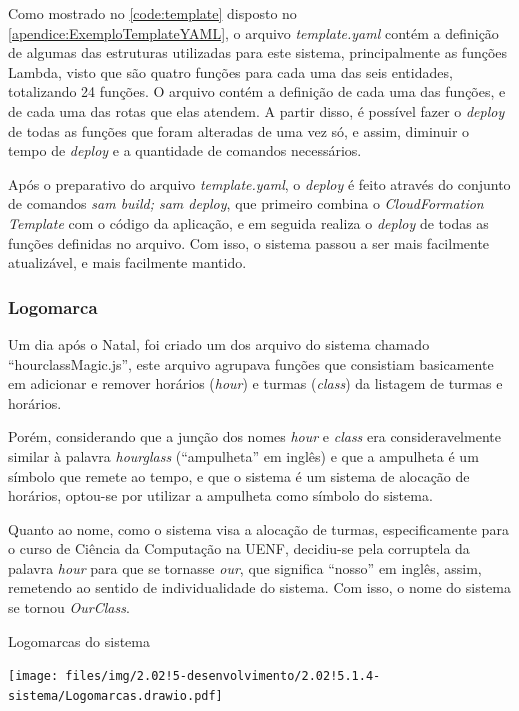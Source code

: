 Como mostrado no \autoref{code:template} disposto no \autoref{apendice:ExemploTemplateYAML}, o arquivo \textit{template.yaml} contém a definição de algumas das estruturas utilizadas para este sistema, principalmente as funções Lambda, visto que são quatro funções para cada uma das seis entidades, totalizando 24 funções. O arquivo contém a definição de cada uma das funções, e de cada uma das rotas que elas atendem. A partir disso, é possível fazer o \textit{deploy} de todas as funções que foram alteradas de uma vez só, e assim, diminuir o tempo de \textit{deploy} e a quantidade de comandos necessários.

Após o preparativo do arquivo \textit{template.yaml}, o \textit{deploy} é feito através do conjunto de comandos \textit{sam build; sam deploy}, que primeiro combina o \textit{CloudFormation Template} com o código da aplicação, e em seguida realiza o \textit{deploy} de todas as funções definidas no arquivo. Com isso, o sistema passou a ser mais facilmente atualizável, e mais facilmente mantido.

\subsubsection{Logomarca} \label{sssec:Logomarca}

Um dia após o Natal, foi criado um dos arquivo do sistema chamado ``hourclassMagic.js'', este arquivo agrupava funções que consistiam basicamente em adicionar e remover horários (\textit{hour}) e turmas (\textit{class}) da listagem de turmas e horários.

Porém, considerando que a junção dos nomes \textit{hour} e \textit{class} era consideravelmente similar à palavra \textit{hourglass} (``ampulheta'' em inglês) e que a ampulheta é um símbolo que remete ao tempo, e que o sistema é um sistema de alocação de horários, optou-se por utilizar a ampulheta como símbolo do sistema.

Quanto ao nome, como o sistema visa a alocação de turmas, especificamente para o curso de Ciência da Computação na UENF, decidiu-se pela corruptela da palavra \textit{hour} para que se tornasse \textit{our}, que significa ``nosso'' em inglês, assim, remetendo ao sentido de individualidade do sistema. Com isso, o nome do sistema se tornou \textit{OurClass}.

\begin{MyCenteredFigure}
  \caption{Logomarcas do sistema}
  \label{fig:Logomarcas}
  \texttt{[image: files/img/2.02!5-desenvolvimento/2.02!5.1.4-sistema/Logomarcas.drawio.pdf]}
\end{MyCenteredFigure}

